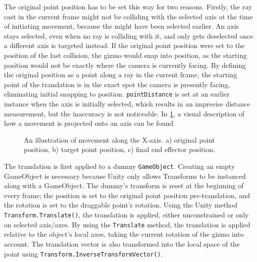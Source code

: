 The original point position has to be set this way for two reasons. Firstly, the ray cast in the current frame might not be colliding with the selected axis at the time of initiating movement, because the might have been selected earlier. An axis stays selected, even when no ray is colliding with it, and only gets deselected once a different axis is targeted instead. If the original point position were set to the position of the last collision, the gizmo would snap into position, as the starting position would not be exactly where the camera is currently facing. By defining the original position as a point along a ray in the current frame, the starting point of the translation is in the exact spot the camera is presently facing, eliminating initial snapping to position. \texttt{pointDistance} is set at an earlier instance when the axis is initially selected, which results in an imprecise distance measurement, but the inaccuracy is not noticeable. In \ref{fig:movementdemo}, a visual description of how a movement is projected onto an axis can be found.

\begin{figure}[h]
    \centering
    \subfloat[At 1.00 sensitivity.]{
        
        \label{full}
    }
    \qquad
    \subfloat[At 0.80 sensitivity]{
        
        \label{eighty}
    }
    
    \caption{An illustration of movement along the X-axis. a) original point position, b) target point position, c) final end effector position.}
    \label{fig:movementdemo}
\end{figure}

The translation is first applied to a dummy \texttt{GameObject}. Creating an empty GameObject is necessary because Unity only allows Transforms to be instanced along with a GameObject. The dummy's transform is reset at the beginning of every frame; the position is set to the original point position pre-translation, and the rotation is set to the draggable point's rotation. Using the Unity method \texttt{Transform.Translate()}, the translation is applied, either unconstrained or only on selected axis/axes. By using the \texttt{Translate} method, the translation is applied relative to the object's local axes, taking the current rotation of the gizmo into account. The translation vector is also transformed into the local space of the point using \texttt{Transform.InverseTransformVector()}. 

